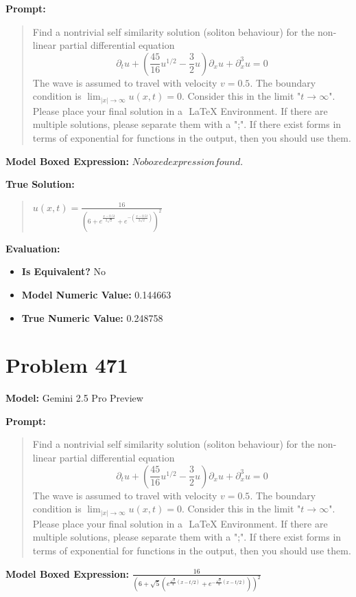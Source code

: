 \documentclass{article}
\begin{document}
\textbf{Prompt:}
\begin{quote}
Find a nontrivial self similarity solution (soliton behaviour) for the non-linear partial differential equation $$ \partial_t u + \left(\frac{45}{16} u^{1/2} - \frac{3}{2} u\right)\partial_x u + \partial_x^3 u=0 $$ The wave is assumed to travel with velocity $v=0.5$. The boundary condition is $\lim_{|x|\to\infty} u(x,t)=0$. Consider this in the limit "$t\rightarrow\infty$". Please place your final solution in a $\boxed{}$ LaTeX Environment. If there are multiple solutions, please separate them with a ";". If there exist forms in terms of exponential for functions in the output, then you should use them.
\end{quote}
\textbf{Model Boxed Expression:} $No boxed expression found.$

\textbf{True Solution:}
\begin{quote}
$u(x,t) = \frac{16}{\left(6 + e^{\frac{x-0.5t}{2\sqrt{2}}} + e^{-\left(\frac{x-0.5t}{2\sqrt{2}}\right)}\right)^2}$
\end{quote}

\textbf{Evaluation:}
\begin{itemize}
\item \textbf{Is Equivalent?} No
\item \textbf{Model Numeric Value:} 0.144663
\item \textbf{True Numeric Value:} 0.248758
\end{itemize}
\vspace{1cm}
\section*{Problem 471}
\textbf{Model:} Gemini 2.5 Pro Preview

\textbf{Prompt:}
\begin{quote}
Find a nontrivial self similarity solution (soliton behaviour) for the non-linear partial differential equation $$ \partial_t u + \left(\frac{45}{16} u^{1/2} - \frac{3}{2} u\right)\partial_x u + \partial_x^3 u=0 $$ The wave is assumed to travel with velocity $v=0.5$. The boundary condition is $\lim_{|x|\to\infty} u(x,t)=0$. Consider this in the limit "$t\rightarrow\infty$". Please place your final solution in a $\boxed{}$ LaTeX Environment. If there are multiple solutions, please separate them with a ";". If there exist forms in terms of exponential for functions in the output, then you should use them.
\end{quote}
\textbf{Model Boxed Expression:} $\frac{16}{\left(6+\sqrt{5}\left(e^{\frac{\sqrt{2}}{4}(x-t/2)} + e^{-\frac{\sqrt{2}}{4}(x-t/2)}\right)\right)^2}$
\end{document}
